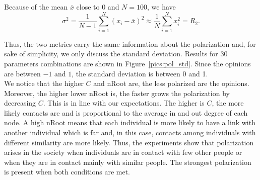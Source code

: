 Because of the mean $\overline{x}$ close to 0 and $N=100$, we have
$$ \sigma^2 = \frac{1}{N-1} \sum_{i=1}^N (x_i-\overline{x})^2 \approx \frac{1}{N} \sum_{i=1}^N x_i^2 = R_2.$$

Thus, the two metrics carry the same information about the polarization and, for sake of simplicity, we only discuss the standard deviation. Results for 30 parameters combinations are shown in Figure~\ref{pics:pol_std}. Since the opinions are between $-1$ and $1$, the standard deviation is between 0 and 1.\\

We notice that the higher $C$ and nRoot are, the less polarized are the opinions. Moreover, the higher lower nRoot is, the faster grows the polarization by decreasing $C$. This is in line with our expectations. The higher is $C$, the more likely contacts are and is proportional to the average in and out degree of each node. A high nRoot means that each individual is more likely to have a link with another individual which is far and, in this case, contacts among individuals with different similarity are more likely. Thus, the experiments show that polarization arises in the society when individuals are in contact with few other people or when they are in contact mainly with similar people. The strongest polarization is present when both conditions are met.\\

